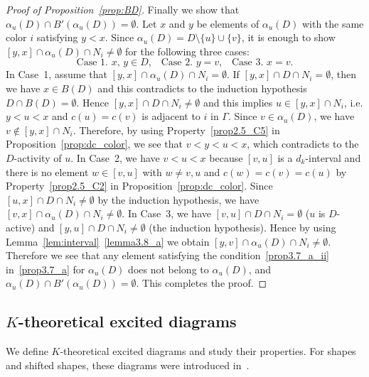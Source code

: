 \documentclass[10pt]{amsart}
\theoremstyle{definition}
\theoremstyle{remark}
\begin{document}
\begin{proof}[Proof of Proposition~\ref{prop:BD}]
Finally we show that $\alpha_u(D) \cap B'(\alpha_u(D)) = \emptyset$.
Let $x$ and $y$ be elements of $\alpha_u(D)$ with the same color $i$ satisfying $y<x$.
Since $\alpha_u(D) = D \setminus \{ u \} \cup \{ v\}$, it is enough to 
show 
$[y,x] \cap \alpha_u(D) \cap N_i \neq \emptyset$
for the following three cases:
$$
\text{Case~1. $x$, $y \in D$,}
\quad
\text{Case~2. $y = v$,}
\quad
\text{Case~3. $x = v$.}
$$
In Case~1, assume that $[y,x] \cap \alpha_u(D) \cap N_i = \emptyset$.
If $[y,x] \cap D \cap N_i = \emptyset$, then we have $x \in B(D)$ 
and this contradicts to the induction hypothesis $D \cap B(D) = \emptyset$.
Hence $[y,x] \cap D \cap N_i \neq \emptyset$ 
and this implies $u \in [y,x] \cap N_i$, 
i.e. $y < u < x$ and $c(u) = c(v)$ is adjacent to $i$ in $\Gamma$.
Since $v \in \alpha_u(D)$, we have $v \not\in [y,x] \cap N_i$.
Therefore, by using Property~\ref{prop2.5_C5} in Proposition~\ref{prop:dc_color}, we see that 
$v < y < u < x$, which contradicts to the $D$-activity of $u$.
In Case~2, we have $v < u < x$ because $[v,u]$ is a $d_k$-interval 
and there is no element $w \in [v,u]$ with $w \neq v, u$ and $c(w) = c(v) = c(u)$ 
by Property~\ref{prop2.5_C2} in Proposition~\ref{prop:dc_color}.
Since $[u,x] \cap D \cap N_i \neq \emptyset$ by the induction hypothesis, 
we have $[v,x] \cap \alpha_u(D) \cap N_i \neq \emptyset$.
In Case~3, we have $[v,u] \cap D \cap N_i = \emptyset$ ($u$ is $D$-active) 
and $[y,u] \cap D \cap N_i \neq \emptyset$ (the induction hypothesis).
Hence by using Lemma~\ref{lem:interval}~\ref{lemma3.8_a} we obtain $[y,v] \cap \alpha_u(D) \cap N_i \neq \emptyset$.
Therefore we see that any element satisfying the condition~\ref{prop3.7_a_ii} in~\ref{prop3.7_a} for $\alpha_u(D)$ 
does not belong to $\alpha_u(D)$, and $\alpha_u(D) \cap B'(\alpha_u(D)) = \emptyset$.
This completes the proof.
\end{proof}

\subsection{%
\texorpdfstring{$K$}{K}-theoretical excited diagrams
}

We define $K$-theoretical excited diagrams and study their properties.
For shapes and shifted shapes, these diagrams were introduced in~\cite{GK}.
\end{document}
